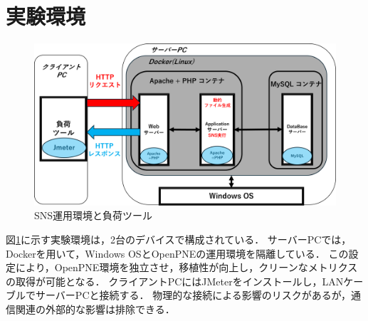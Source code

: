 \documentclass[twoside,twocolumn,10pt]{jarticle}  %
\begin{document}

\section{実験環境}
\label{sec:environment}
\begin{figure}[h]
  \centering
  \includegraphics[scale=0.275]{figures/SNS_Docker.png}
  \vspace{-0.4cm}
  \caption{SNS運用環境と負荷ツール}
  \label{fig:1}
  \vspace{-0.2cm}
\end{figure}
図\ref{fig:1}に示す実験環境は，2台のデバイスで構成されている．
サーバーPCでは，Dockerを用いて，Windows OSとOpenPNEの運用環境を隔離している．
この設定により，OpenPNE環境を独立させ，移植性が向上し，クリーンなメトリクスの取得が可能となる．
クライアントPCにはJMeterをインストールし，LANケーブルでサーバーPCと接続する．
物理的な接続による影響のリスクがあるが，通信関連の外部的な影響は排除できる．
\end{document}
